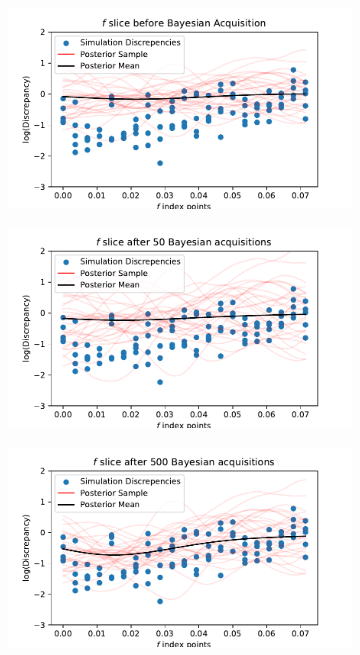 \begin{figure}[htbp]
\begin{subfigure}[b]{0.33\textwidth}
    \end{subfigure}
    \begin{subfigure}[b]{0.33\textwidth}
        \centering
        \includegraphics[width=\textwidth]{../champagne_GP_images/initial_f_slice_log_discrep.pdf}
    \end{subfigure}%
    \hfill%
    \begin{subfigure}[b]{0.33\textwidth}
        \centering
        \includegraphics[width=\textwidth]{../champagne_GP_images/f_slice_50_bolfi_updates_log_discrep.pdf}
    \end{subfigure}%
    \hfill%
    \begin{subfigure}[b]{0.33\textwidth}
        \centering
        \includegraphics[width=\textwidth]{../champagne_GP_images/f_slice_500_bolfi_updates_log_discrep.pdf}

\end{subfigure}
\end{figure}
